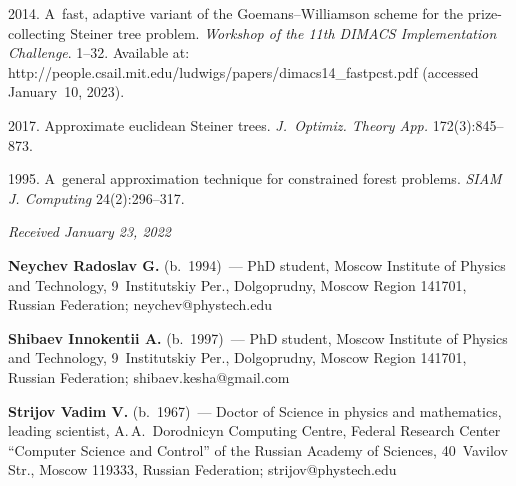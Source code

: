 \begin{multicols}{2}
{{\begin{thebibliography}{99}
 2014. 
A~fast, adaptive variant of the Goemans--Williamson scheme for the prize-collecting Steiner tree problem. 
\textit{Workshop of the 11th DIMACS Implementation Challenge}. 1--32.
Available at: 
{\sf http://people.csail.mit.edu/ludwigs/papers/\linebreak dimacs14\_fastpcst.pdf} (accessed January~10, 2023).

2017. Approximate euclidean Steiner trees. \textit{J.~Optimiz. Theory  App.} 172(3):845--873.

 1995. 
A~general approximation technique for constrained forest problems. \textit{SIAM J. Computing} 24(2):296--317.
 \end{thebibliography}

 }
 }

\end{multicols}

\vspace*{-6pt}

\hfill{\small\textit{Received January 23, 2022}}

\Contr

\noindent
\textbf{Neychev Radoslav G.} (b.\ 1994)~--- 
PhD student, Moscow Institute of Physics and Technology, 9~Institutskiy Per., Dolgoprudny, Moscow Region 141701, Russian Federation;
\mbox{neychev@phystech.edu}

\vspace*{3pt}

\noindent
\textbf{Shibaev Innokentii A.} (b.\ 1997)~--- 
PhD student, Moscow Institute of Physics and Technology, 9~Institutskiy Per., Dolgoprudny, Moscow Region 141701, Russian Federation; 
\mbox{shibaev.kesha@gmail.com}

\vspace*{3pt}

\noindent
\textbf{Strijov Vadim V.} (b.\ 1967)~--- 
Doctor of Science in physics and mathematics, leading scientist, A.\,A.~Dorodnicyn Computing Centre, 
Federal Research Center ``Computer Science and Control'' of the Russian Academy of Sciences, 40~Vavilov Str., Moscow 119333, Russian Federation;
\mbox{strijov@phystech.edu}


\label{end\stat}

\renewcommand{\bibname}{\protect\rm Литература} 